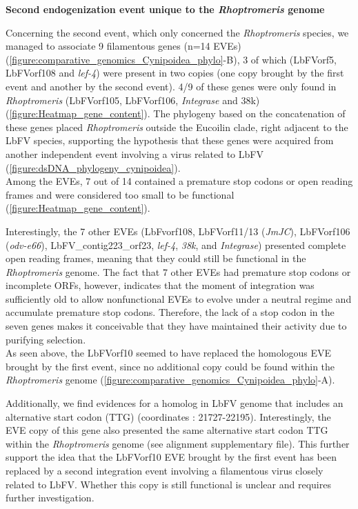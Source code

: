 \textbf{Second endogenization event unique to the \textit{Rhoptromeris} genome}

Concerning the second event, which only concerned the \textit{Rhoptromeris} species, we managed to associate 9 filamentous genes (n=14 EVEs) (\figurename{\ref{figure:comparative_genomics_Cynipoidea_phylo}}-B), 3 of which (LbFVorf5, LbFVorf108 and \textit{lef-4}) were present in two copies (one copy brought by the first event and another by the second event). 4/9 of these genes were only found in \textit{Rhoptromeris} (LbFVorf105, LbFVorf106, \textit{Integrase} and 38k)(\figurename{\ref{figure:Heatmap_gene_content}}). The phylogeny based on the concatenation of these genes placed \textit{Rhoptromeris} outside the Eucoilin clade, right adjacent to the LbFV species, supporting the hypothesis that these genes were acquired from another independent event involving a virus related to LbFV (\figurename{\ref{figure:dsDNA_phylogeny_cynipoidea}}). \\

Among the EVEs, 7 out of 14 contained a premature stop codons or open reading frames and were considered too small to be functional (\figurename{\ref{figure:Heatmap_gene_content}}).

Interestingly, the 7 other EVEs (LbFvorf108, LbFVorf11/13 (\textit{JmJC}), LbFVorf106 (\textit{odv-e66}), LbFV\_contig223\_orf23, \textit{lef-4}, \textit{38k}, and \textit{Integrase}) presented complete open reading frames, meaning that they could still be functional in the \textit{Rhoptromeris} genome. The fact that 7 other EVEs had premature stop codons or incomplete ORFs, however, indicates that the moment of integration was sufficiently old to allow nonfunctional EVEs to evolve under a neutral regime and accumulate premature stop codons. Therefore, the lack of a stop codon in the seven genes makes it conceivable that they have maintained their activity due to purifying selection. \\

As seen above, the LbFVorf10 seemed to have replaced the homologous EVE brought by the first event, since no additional copy could be found within the \textit{Rhoptromeris} genome (\figurename{\ref{figure:comparative_genomics_Cynipoidea_phylo}}-A). 

Additionally, we find evidences for a homolog in LbFV genome that includes an alternative start codon (TTG) (coordinates : 21727-22195). Interestingly, the EVE copy of this gene also presented the same alternative start codon TTG within the \textit{Rhoptromeris} genome (see alignment supplementary file). This further support the idea that the LbFVorf10 EVE brought by the first event has been replaced by a second integration event involving a filamentous virus closely related to LbFV. Whether this copy is still functional is unclear and requires further investigation.\\

